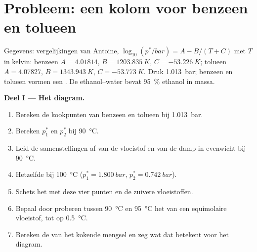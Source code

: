 \section{Probleem: een kolom voor benzeen en tolueen}

\begin{problem}
\label{pb:b2:liquid-vapour-diagrams:1}
Gegevens: vergelijkingen van Antoine, $\log_{10}(p^*/\unit{bar}) = A - B/(T + C)$ met $T$ in
kelvin: benzeen $A = 4.01814$, $B = \qty{1203.835}{K}$, $C =
\qty{-53.226}{K}$; tolueen $A = 4.07827$, $B = \qty{1343.943}{K}$, $C =
\qty{-53.773}{K}$. Druk \qty{1.013}{bar}; benzeen en tolueen vormen een . De  ethanol--water bevat 95~\% ethanol in massa.

\medskip
\noindent\textbf{Deel I --- Het diagram.}
\begin{enumerate}
  \item Bereken de kookpunten van benzeen en tolueen bij \qty{1.013}{bar}.
  \item Bereken $p_1^*$ en $p_2^*$ bij \qty{90}{\degreeCelsius}.
  \item Leid de samenstellingen af van de vloeistof en van de damp in evenwicht
        bij \qty{90}{\degreeCelsius}.
  \item Hetzelfde bij \qty{100}{\degreeCelsius} ($p_1^* = \qty{1.800}{bar}$, $p_2^* =
        \qty{0.742}{bar}$).
  \item Schets het  met deze vier punten en de zuivere vloeistoffen.
  \item Bepaal door proberen tussen \qty{90}{\degreeCelsius} en
        \qty{95}{\degreeCelsius} het  van een equimolaire vloeistof, tot op
        \qty{0.5}{\degreeCelsius}.
  \item Bereken de  van het kokende mengsel en zeg wat dat betekent voor
        het diagram.
\end{enumerate}


\end{problem}
